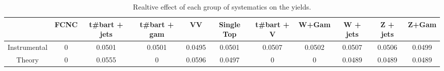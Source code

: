 \begin{table}[htbp]
\begin{center}
\begin{tabular}{|c|c|c|c|c|c|c|c|c|c|c|}
\hline 
      & FCNC      & t#bar{t} + jets      & t#bar{t} +  gam      & VV      & Single Top      & t#bar{t} + V      & W+Gam      & W + jets      & Z + jets      & Z+Gam \\ 
\hline 
 Instrumental & 0 & 0.0501 & 0.0501 & 0.0495 & 0.0501 & 0.0507 & 0.0502 & 0.0507 & 0.0506 & 0.0499 \\ 
 Theory & 0 & 0.0555 & 0 & 0.0596 & 0.0497 & 0 & 0 & 0.0489 & 0.0489 & 0.0489 \\ 
\hline 
\end{tabular} 
\caption{Realtive effect of each group of systematics on the yields.} 
\end{center} 
\end{table} 
